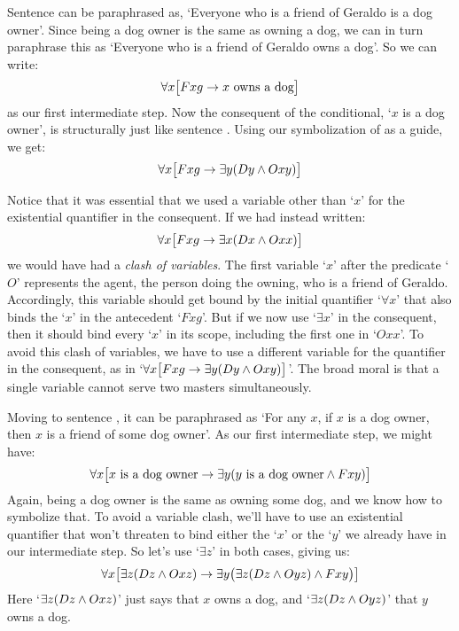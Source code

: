 Sentence  can be paraphrased as, `Everyone who is a friend of Geraldo is a dog owner'.  Since being a dog owner is the same as owning a dog, we can in turn paraphrase this as `Everyone who is a friend of Geraldo owns a dog'. So we can write:
$$\forall x \bigl[Fxg \rightarrow x \text{ owns a dog}\bigr]$$
as our first intermediate step.  Now the consequent of the conditional, `$x$ is a dog owner', is structurally just like sentence . Using our symbolization of  as a guide, we get:
$$\forall x \bigl[Fxg \rightarrow \exists y(Dy \wedge Oxy)\bigr]$$

Notice that it was essential that we used a variable other than `$x$' for the existential quantifier in the consequent.  If we had instead written:
$$\forall x \bigl[Fxg \rightarrow \exists x(Dx \wedge Oxx)\bigr]$$
we would have had a \emph{clash of variables}. The first variable `$x$' after the predicate `$O$' represents the agent, the person doing the owning, who is a friend of Geraldo.  Accordingly, this variable should get bound by the initial quantifier `$\forall x$' that  also binds the `$x$' in the antecedent `$Fxg$'.  But if we now use `$\exists x$' in the consequent, then it should bind every `$x$' in its scope, including the first one in `$Oxx$'. To avoid this clash of variables, we have to use a different variable for the quantifier in the consequent, as in `$\forall x \bigl[Fxg \rightarrow \exists y(Dy \wedge Oxy)\bigr]$'.   The broad moral is that a single variable cannot serve two masters simultaneously.


Moving to sentence , it can be paraphrased as `For any $x$, if $x$ is a dog owner, then $x$ is a friend of some dog owner'. As our first intermediate step, we might have:
$$\forall x\bigl[\mbox{$x$ is a dog owner}\rightarrow\exists y(\mbox{$y$ is a dog owner}\wedge Fxy)\bigr]$$
Again, being a dog owner is the same as owning some dog, and we know how to symbolize that.  To avoid a variable clash, we'll have to use an existential quantifier that won't threaten to bind either the `$x$' or the `$y$' we already have in our intermediate step.  So let's use `$\exists z$' in both cases, giving us:
$$\forall x\bigl[\exists z(Dz \wedge Oxz)\rightarrow\exists y\bigl(\exists z(Dz \wedge Oyz)\wedge Fxy\bigr)\bigr]$$
Here `$\exists z(Dz \wedge Oxz)$' just says that $x$ owns a dog, and  `$\exists z(Dz \wedge Oyz)$' that $y$ owns a dog.


